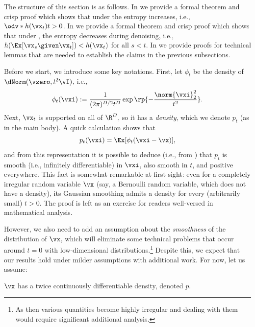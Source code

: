 \documentclass[../../book-main.tex]{subfiles}
\begin{document}
The structure of this section is as follows. In  we provide a formal theorem and crisp proof which shows that under  the entropy increases, i.e., \(\odv*{h(\vx_{t})}{t} > 0\). In  we provide a formal theorem and crisp proof which shows that under , the entropy decreases during denoising, i.e., \(h(\Ex[\vx_{s} \given \vx_{t}]) < h(\vx_{t})\) for all \(s < t\). In  we provide proofs for technical lemmas that are needed to establish the claims in the previous subsections.

Before we start, we introduce some key notations. First, let \(\phi_{t}\) be the density of \(\dNorm(\vzero, t^{2}\vI)\), i.e.,
\begin{equation}\label{eq:gaussian_noise_time_t}
    \phi_{t}(\vxi) := \frac{1}{(2\pi)^{D/2}t^{D}}\exp\rp{-\frac{\norm{\vxi}_{2}^{2}}{t^{2}}}.
\end{equation}
Next, \(\vx_{t}\) is supported on all of \(\R^{D}\), so it has a \textit{density}, which we denote \(p_{t}\) (as in the main body). A quick calculation shows that
\begin{equation}\label{eq:p_t_representation}
    p_{t}(\vxi) = \Ex[\phi_{t}(\vxi - \vx)],
\end{equation}
and from this representation it is possible to deduce (i.e., from ) that \(p_{t}\) is smooth (i.e., infinitely differentiable) in \(\vxi\), also smooth in \(t\), and positive everywhere. This fact is somewhat remarkable at first sight: even for a completely irregular random variable \(\vx\) (say, a Bernoulli random variable, which does not have a density), its Gaussian smoothing admits a density for every (arbitrarily small) \(t > 0\). The proof is left as an exercise for readers well-versed in mathematical analysis.

However, we also need to add an assumption about the \textit{smoothness} of the distribution of \(\vx\), which will eliminate some technical problems that occur around \(t = 0\) with low-dimensional distributions.\footnote{As then various quantities become highly irregular and dealing with them would require significant additional analysis.} Despite this, we expect that our results hold under milder assumptions with additional work. For now, let us assume:
\begin{assumption}\label{assumption:entropy_x_density}
    \(\vx\) has a twice continuously differentiable density, denoted \(p\).
\end{assumption}
\end{document}

